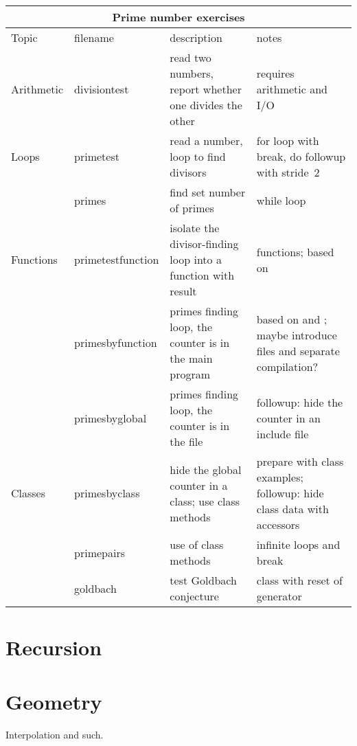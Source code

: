 \begin{landscape}
  \begin{tabular}{|l|l|p{3in}|p{3in}|}
    \hline
    \multicolumn{4}{|c|}{Prime number exercises}\\
    \hline
    Topic&filename&description&notes\\
    \hline
    \hline
    Arithmetic&divisiontest
    &read two numbers, report whether one divides the other
    &requires arithmetic and I/O\\
    \hline
    Loops&primetest&read a number, loop to find divisors
    &for loop with break, do followup with stride~2\\
    &primes&find set number of primes&while loop\\
    \hline
    Functions&primetestfunction&isolate the divisor-finding loop
    into a function with \n{bool} result
    &functions; based on \n{primetest}\\
    \hline
    &primesbyfunction&primes finding loop, the counter is in the main
    program&
    based on \n{primes} and \n{primetestfunction}; maybe introduce
    \n{.h} files and separate compilation?\\
    \hline      
    &primesbyglobal&primes finding loop, the counter is in the file
    &followup: hide the counter in an include file\\
    \hline
    Classes&primesbyclass&hide the global counter in a class; use
    class methods
    &prepare with class examples; followup: hide class data with accessors\\
    \hline
    &primepairs&use of class methods&infinite loops and break\\
    &goldbach&test Goldbach conjecture&class with reset of generator\\
    \hline
  \end{tabular}
\end{landscape}

\section{Recursion}


\section{Geometry}

Interpolation and such.

